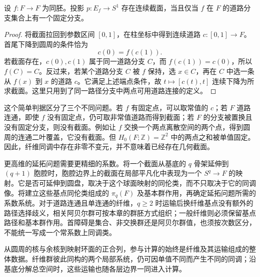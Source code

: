 \begin{proposition}\label{g2:prop:mapping-torus-section}
	设 \(f:F\to F\) 为同胚。投影 \(p:E_f\to S^1\) 存在连续截面，当且仅当 \(f\) 在 \(F\) 的道路分支集合上有一个固定分支。
\end{proposition}
\begin{proof}
	将截面拉回到参数区间 \([0,1]\)，在柱坐标中得到连续道路 \(c:[0,1]\to F\)。首尾下降到圆周的条件恰为
	\[
		c(0)=f(c(1)).
	\]
	若截面存在，\(c(0),c(1)\) 属于同一道路分支 \(C\)，而 \(f(c(1))=c(0)\)，所以 \(f(C)=C\)。反过来，若某个道路分支 \(C\) 被 \(f\) 保持，选 \(x\in C\)，再在 \(C\) 中选一条从 \(f(x)\) 到 \(x\) 的道路 \(c\)。它满足上述端点条件，故 \(t\mapsto[c(t),t]\) 连续下降为所求截面。这里只用到了同一路径分支中两点可用道路连接的定义。
\end{proof}

这个简单判据区分了三个不同问题。若 \(f\) 有固定点，可以取常值的 \(c\)；若 \(F\) 道路连通，即使 \(f\) 没有固定点，仍可取非常值道路而得到截面；若 \(F\) 的分支被置换且没有固定分支，则没有截面。例如让 \(f\) 交换一个两点离散空间的两个点，得到圆周的连通二叶覆盖，它没有截面。但 \(H_0(F;\mathbb Z)=\mathbb Z^2\) 中的两点之和被单值固定。因此，纤维同调中存在非零不变元，并不意味着已经存在几何截面。

\ProseParagraphBreak

更高维的延拓问题需要更精细的系数。将一个截面从基底的 \(q\) 骨架延伸到 \((q+1)\) 胞腔时，胞腔边界上的截面在局部平凡化中表现为一个 \(S^q\to F\) 的映射。它是否可延伸到圆盘，取决于这个球面映射的同伦类，而不只取决于它的同调像。将建立这些基点同伦类组成的 \(\pi_q(F)\) 及基本群作用，再确定延拓问题所需的系数系统。对于道路连通且单连通的纤维，\(q\geq2\) 时运输后换纤维基点没有额外的路径选择歧义，相关阿贝尔群可按本章的群胚方式组织；一般纤维则必须保留基点路径和基本群作用。首障碍是集合、非交换群还是阿贝尔群值，也须按次数区分，不能统一写成一个常系数上同调类。

\ProseParagraphBreak

从圆周的核与余核到映射环面的正合列，参与计算的始终是纤维及其运输组成的整体数据。纤维群彼此同构的两个局部系统，仍可因单值不同而产生不同的同调；沿基底分解总空间时，这些运输也随各层边界一同进入计算。
